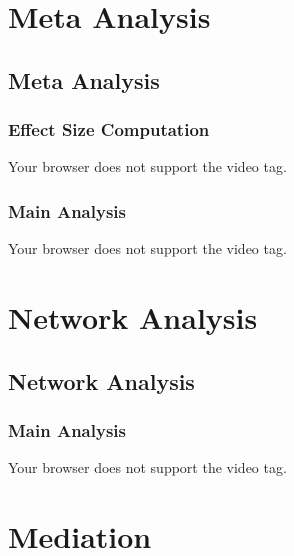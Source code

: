 \documentclass[
  letterpaper,
  DIV=11,
  numbers=noendperiod]{scrreprt}
\begin{document}
\hypertarget{meta-analysis}{%
\chapter{Meta Analysis}\label{meta-analysis}}

\hypertarget{meta-analysis-1}{%
\section{Meta Analysis}\label{meta-analysis-1}}

\hypertarget{effect-size-computation}{%
\subsection{Effect Size Computation}\label{effect-size-computation}}

Your browser does not support the video tag.

\hypertarget{main-analysis-19}{%
\subsection{Main Analysis}\label{main-analysis-19}}

Your browser does not support the video tag.


\hypertarget{network-analysis}{%
\chapter{Network Analysis}\label{network-analysis}}

\hypertarget{network-analysis-1}{%
\section{Network Analysis}\label{network-analysis-1}}

\hypertarget{main-analysis-20}{%
\subsection{Main Analysis}\label{main-analysis-20}}

Your browser does not support the video tag.


\hypertarget{mediation}{%
\chapter{Mediation}\label{mediation}}
\end{document}
